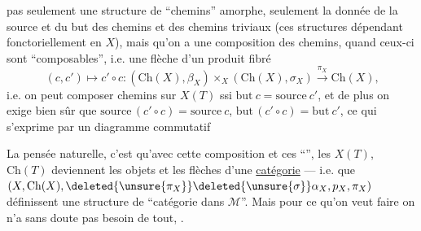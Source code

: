  pas seulement une structure de  ``chemins''  amorphe,  seulement la donnée de la source et du but des chemins et des chemins triviaux (ces structures  dépendant fonctoriellement en $X$), mais qu'on a une composition des chemins, quand  ceux-ci sont ``composables'', i.e. une  flèche d'un produit fibré
\[
(c,c')\longmapsto c'\circ c:(\mathrm{Ch}(X),\beta_X)\times_X(\mathrm{Ch}(X),\sigma_X)\xrightarrow{\pi_X}\mathrm{Ch}(X)\text{,}
\]
i.e. on peut composer  chemins sur  $X(T)$
ssi $\mathrm{but}\ c=\mathrm{source}\ c'$, et de plus on exige bien sûr que $\mathrm{source}\,(c'\circ c)=\mathrm{source}\ c$, $\mathrm{but}\,(c'\circ c)=\mathrm{but}\ c'$, ce qui s'exprime par un diagramme commutatif

La pensée naturelle, c'est qu'avec cette composition et ces ``'', les $X(T)$, $\mathrm{Ch}(T)$ deviennent les objets et les flèches d'une \uline{catégorie} --- i.e. que $(X,\mathrm{Ch}(X),\deleted{\unsure{\pi_X}}\deleted{\unsure{\sigma}}\alpha_X,p_X,\pi_X)$ définissent une structure de ``catégorie dans $\mathcal M$''. Mais pour ce qu'on veut faire  on n'a sans doute pas besoin de tout,  .
